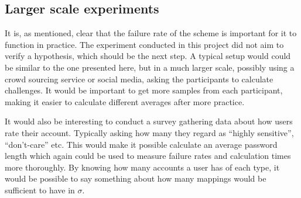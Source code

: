 \subsection{Larger scale experiments}
It is, as mentioned, clear that the failure rate of the scheme is important for it to function in practice. The experiment conducted in this project did not aim to verify a hypothesis, which should be the next step. A typical setup would could be similar to the one presented here, but in a much larger scale, possibly using a crowd sourcing service or social media, asking the participants to calculate challenges. It would be important to get more samples from each participant, making it easier to calculate different averages after more practice.  
\par It would also be interesting to conduct a survey gathering data about how users rate their account. Typically asking how many they regard as ``highly sensitive'', ``don't-care'' etc. This would make it possible calculate an average password length which again could be used to measure failure rates and calculation times more thoroughly. By knowing how many accounts a user has of each type, it would be possible to say something about how many mappings would be sufficient to have in $\sigma$. 
